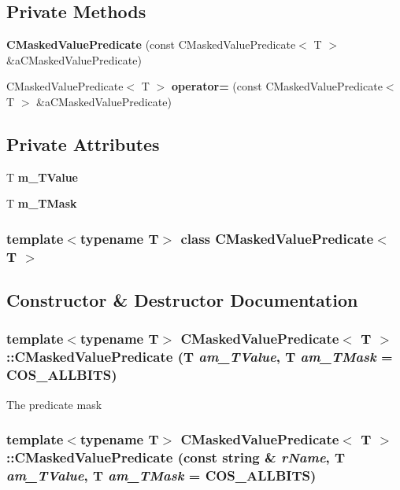 \subsection*{Private Methods}
\begin{CompactItemize}
\item 
{\bf CMasked\-Value\-Predicate} (const CMasked\-Value\-Predicate$<$ T $>$ \&a\-CMasked\-Value\-Predicate)
\item 
CMasked\-Value\-Predicate$<$ T $>$ {\bf operator=} (const CMasked\-Value\-Predicate$<$ T $>$ \&a\-CMasked\-Value\-Predicate)
\end{CompactItemize}
\subsection*{Private Attributes}
\begin{CompactItemize}
\item 
T {\bf m\_\-TValue}
\item 
T {\bf m\_\-TMask}
\end{CompactItemize}
\subsubsection*{template$<$typename T$>$ class CMasked\-Value\-Predicate$<$ T $>$}



\subsection{Constructor \& Destructor Documentation}
\subsubsection{\setlength{\rightskip}{0pt plus 5cm}template$<$typename T$>$ CMasked\-Value\-Predicate$<$ T $>$::CMasked\-Value\-Predicate (T {\em am\_\-TValue}, T {\em am\_\-TMask} = {\bf COS\_\-ALLBITS})\hspace{0.3cm}{\tt  [inline]}}\label{classCMaskedValuePredicate_a0}


The predicate mask 
\subsubsection{\setlength{\rightskip}{0pt plus 5cm}template$<$typename T$>$ CMasked\-Value\-Predicate$<$ T $>$::CMasked\-Value\-Predicate (const string \& {\em r\-Name}, T {\em am\_\-TValue}, T {\em am\_\-TMask} = {\bf COS\_\-ALLBITS})\hspace{0.3cm}{\tt  [inline]}}\label{classCMaskedValuePredicate_a1}


